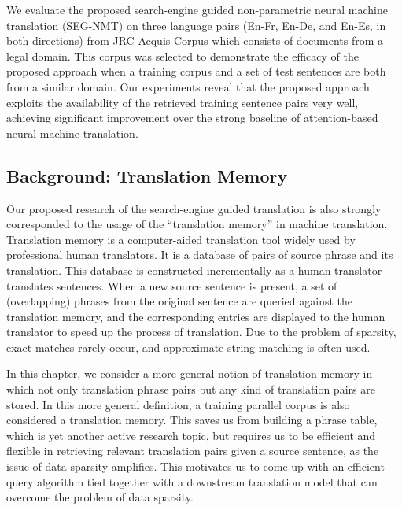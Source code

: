 We evaluate the proposed search-engine guided non-parametric neural machine translation (SEG-NMT) on three language pairs (En-Fr, En-De, and En-Es, in both directions) from JRC-Acquis Corpus\citep{steinberger2006jrc} which consists of documents from a legal domain. This corpus was selected to demonstrate the efficacy of the proposed approach when a training corpus and a set of test sentences are both from a similar domain. Our experiments reveal that the proposed approach exploits the availability of the retrieved training sentence pairs very well, achieving significant improvement over the strong baseline of attention-based neural machine translation\citep{bahdanau2014neural}.

\subsection{Background: Translation Memory}
Our proposed research of the search-engine guided translation is also strongly corresponded to the usage of the ``translation memory'' in machine translation.
Translation memory is a computer-aided translation tool widely used by professional human translators. It is a database of pairs of source phrase and its translation. This database is constructed incrementally as a human translator translates sentences. When a new source sentence is present, a set of (overlapping) phrases from the original sentence are queried against the translation memory, and the corresponding entries are displayed to the human translator to speed up the process of translation. Due to the problem of sparsity, exact matches rarely occur, and approximate string matching is often used.

In this chapter, we consider a more general notion of translation memory in which not only translation phrase pairs but any kind of translation pairs are stored. In this more general definition, a training parallel corpus is also considered a translation memory. This saves us from building a phrase table\citep{koehn2003statistical}, which is yet another active research topic, but requires us to be efficient and flexible in retrieving relevant translation pairs given a source sentence, as the issue of data sparsity amplifies. This motivates us to come up with an efficient query algorithm tied together with a downstream translation model that can overcome the problem of data sparsity.

